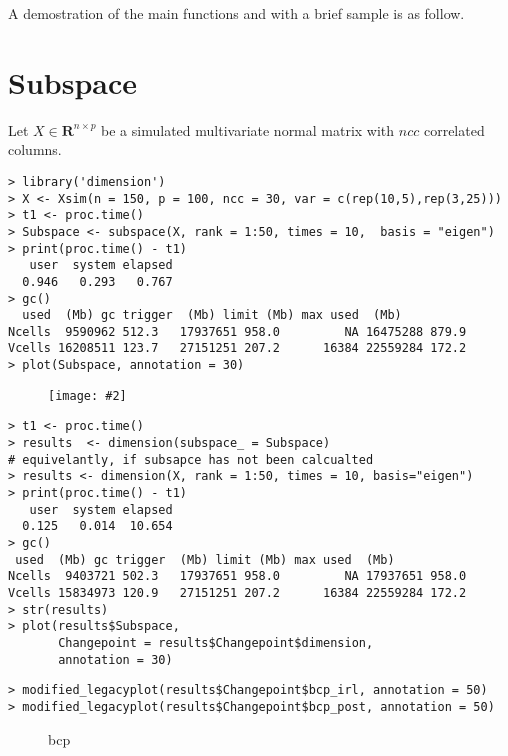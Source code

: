 \documentclass[12pt]{article}
\newcommand{\R}{{\mathbf R}}
\newcommand{\pic}[4]{
\begin{figure}[H]
\centering
\texttt{[image: \#2]}
\caption{#3}
\label{#4}
\end{figure}
}
\newcommand{\sidepic}[8]{
\begin{figure}[H]%
    \centering
    \subfloat[#1]{{\texttt{[image: \#3]} }}%
    \qquad
    \subfloat[#4]{{\texttt{[image: \#6]} }}%
    \caption{#7}%
    \label{#8}%
\end{figure}
}
\begin{document}
A demostration of the main functions and with a brief sample is as follow.

\section{Subspace}

Let $X\in\R^{n\times p}$ be a simulated multivariate normal matrix with $ncc$ correlated columns.

\begin{lstlisting}
> library('dimension')
> X <- Xsim(n = 150, p = 100, ncc = 30, var = c(rep(10,5),rep(3,25)))
> t1 <- proc.time()
> Subspace <- subspace(X, rank = 1:50, times = 10,  basis = "eigen")
> print(proc.time() - t1)
   user  system elapsed
  0.946   0.293   0.767
> gc()
  used  (Mb) gc trigger  (Mb) limit (Mb) max used  (Mb)
Ncells  9590962 512.3   17937651 958.0         NA 16475288 879.9
Vcells 16208511 123.7   27151251 207.2      16384 22559284 172.2
> plot(Subspace, annotation = 30)
\end{lstlisting}
\pic{0.7}{{"Subspace_1_50_Scree"}.pdf}{}{Figure 1}

\begin{lstlisting}
> t1 <- proc.time()
> results  <- dimension(subspace_ = Subspace)
# equivelantly, if subsapce has not been calcualted
> results <- dimension(X, rank = 1:50, times = 10, basis="eigen")
> print(proc.time() - t1)
   user  system elapsed
  0.125   0.014  10.654
> gc()
 used  (Mb) gc trigger  (Mb) limit (Mb) max used  (Mb)
Ncells  9403721 502.3   17937651 958.0         NA 17937651 958.0
Vcells 15834973 120.9   27151251 207.2      16384 22559284 172.2
> str(results)
> plot(results$Subspace,
       Changepoint = results$Changepoint$dimension,
       annotation = 30)
\end{lstlisting}

\begin{lstlisting}
> modified_legacyplot(results$Changepoint$bcp_irl, annotation = 50)
> modified_legacyplot(results$Changepoint$bcp_post, annotation = 50)
\end{lstlisting}
\sidepic{label 1}{7}{{"Subspace_1_50_bcp_irl"}.pdf}{label 2}{7}{{"Subspace_1_50_bcp_post"}.pdf}{bcp}{Figure 3}
\end{document}
